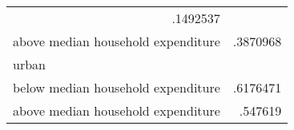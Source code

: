 \begin{table}[!h]
\begin{tabular}{ll}
  \multicolumn{1}{|r}{.1492537} \\
\multicolumn{1}{l}{\hspace{2em}above median household expenditure} &
  \multicolumn{1}{|r}{.3870968} \\
\multicolumn{1}{l}{\hspace{1em}urban} &
  \multicolumn{1}{|r}{} \\
\multicolumn{1}{l}{\hspace{2em}below median household expenditure} &
  \multicolumn{1}{|r}{.6176471} \\
\multicolumn{1}{l}{\hspace{2em}above median household expenditure} &
  \multicolumn{1}{|r}{.547619} \\
\cline{1-2}
\end{tabular}
\end{table}
